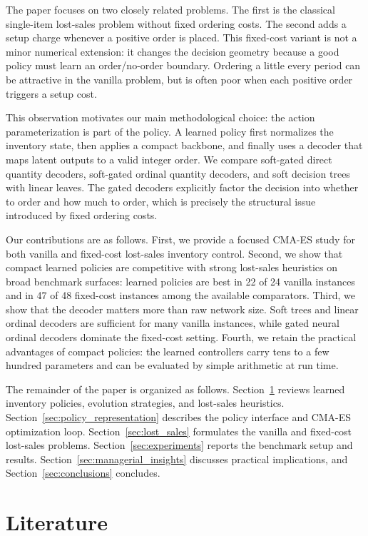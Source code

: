 \documentclass[authoryear,11pt]{elsarticle}
\begin{document}
The paper focuses on two closely related problems. The first is the classical single-item lost-sales problem without fixed ordering costs. The second adds a setup charge whenever a positive order is placed. This fixed-cost variant is not a minor numerical extension: it changes the decision geometry because a good policy must learn an order/no-order boundary. Ordering a little every period can be attractive in the vanilla problem, but is often poor when each positive order triggers a setup cost.

This observation motivates our main methodological choice: the action parameterization is part of the policy. A learned policy first normalizes the inventory state, then applies a compact backbone, and finally uses a decoder that maps latent outputs to a valid integer order. We compare soft-gated direct quantity decoders, soft-gated ordinal quantity decoders, and soft decision trees with linear leaves. The gated decoders explicitly factor the decision into whether to order and how much to order, which is precisely the structural issue introduced by fixed ordering costs.

Our contributions are as follows. First, we provide a focused CMA-ES study for both vanilla and fixed-cost lost-sales inventory control. Second, we show that compact learned policies are competitive with strong lost-sales heuristics on broad benchmark surfaces: learned policies are best in 22 of 24 vanilla instances and in 47 of 48 fixed-cost instances among the available comparators. Third, we show that the decoder matters more than raw network size. Soft trees and linear ordinal decoders are sufficient for many vanilla instances, while gated neural ordinal decoders dominate the fixed-cost setting. Fourth, we retain the practical advantages of compact policies: the learned controllers carry tens to a few hundred parameters and can be evaluated by simple arithmetic at run time.

The remainder of the paper is organized as follows. Section~\ref{sec:literature} reviews learned inventory policies, evolution strategies, and lost-sales heuristics. Section~\ref{sec:policy_representation} describes the policy interface and CMA-ES optimization loop. Section~\ref{sec:lost_sales} formulates the vanilla and fixed-cost lost-sales problems. Section~\ref{sec:experiments} reports the benchmark setup and results. Section~\ref{sec:managerial_insights} discusses practical implications, and Section~\ref{sec:conclusions} concludes.

\section{Literature}
\label{sec:literature}
\end{document}
